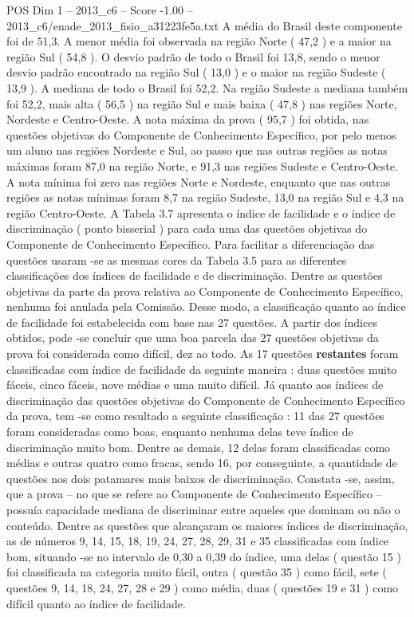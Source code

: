 \begin{textsample}{POS Dim 1 – 2013\_c6 – Score -1.00 – 2013\_c6/enade\_2013\_fisio\_a31223fe5a.txt}
A média do Brasil deste componente foi de 51,3.
A menor média foi observada na região Norte ( 47,2 ) e a maior na região Sul ( 54,8 ).
O desvio padrão de todo o Brasil foi 13,8, sendo o menor desvio padrão encontrado na região Sul ( 13,0 ) e o maior na região Sudeste ( 13,9 ).
A mediana de todo o Brasil foi 52,2.
Na região Sudeste a mediana também foi 52,2, mais alta ( 56,5 ) na região Sul e mais baixa ( 47,8 ) nas regiões Norte, Nordeste e Centro-Oeste.
A nota máxima da prova ( 95,7 ) foi obtida, nas questões objetivas do Componente de Conhecimento Específico, por pelo menos um aluno nas regiões Nordeste e Sul, ao passo que nas outras regiões as notas máximas foram 87,0 na região Norte, e 91,3 nas regiões Sudeste e Centro-Oeste.
A nota mínima foi zero nas regiões Norte e Nordeste, enquanto que nas outras regiões as notas mínimas foram 8,7 na região Sudeste, 13,0 na região Sul e 4,3 na região Centro-Oeste.
A Tabela 3.7 apresenta o índice de facilidade e o índice de discriminação ( ponto bisserial ) para cada uma das questões objetivas do Componente de Conhecimento Específico.
Para facilitar a diferenciação das questões usaram -se as mesmas cores da Tabela 3.5 para as diferentes classificações dos índices de facilidade e de discriminação.
Dentre as questões objetivas da parte da prova relativa ao Componente de Conhecimento Específico, nenhuma foi anulada pela Comissão.
Desse modo, a classificação quanto ao índice de facilidade foi estabelecida com base nas 27 questões.
A partir dos índices obtidos, pode -se concluir que uma boa parcela das 27 questões objetivas da prova foi considerada como difícil, dez ao todo.
As 17 questões \textbf{restantes} foram classificadas com índice de facilidade da seguinte maneira : duas questões muito fáceis, cinco fáceis, nove médias e uma muito difícil.
Já quanto aos índices de discriminação das questões objetivas do Componente de Conhecimento Específico da prova, tem -se como resultado a seguinte classificação : 11 das 27 questões foram consideradas como boas, enquanto nenhuma delas teve índice de discriminação muito bom.
Dentre as demais, 12 delas foram classificadas como médias e outras quatro como fracas, sendo 16, por conseguinte, a quantidade de questões nos dois patamares mais baixos de discriminação.
Constata -se, assim, que a prova – no que se refere ao Componente de Conhecimento Específico – possuía capacidade mediana de discriminar entre aqueles que dominam ou não o conteúdo.
Dentre as questões que alcançaram os maiores índices de discriminação, as de números 9, 14, 15, 18, 19, 24, 27, 28, 29, 31 e 35 classificadas com índice bom, situando -se no intervalo de 0,30 a 0,39 do índice, uma delas ( questão 15 ) foi classificada na categoria muito fácil, outra ( questão 35 ) como fácil, sete ( questões 9, 14, 18, 24, 27, 28 e 29 ) como média, duas ( questões 19 e 31 ) como difícil quanto ao índice de facilidade.

\end{textsample}
